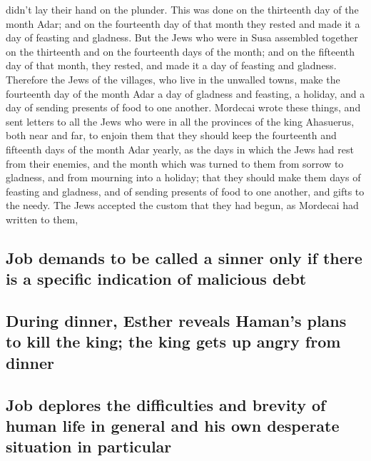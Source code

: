 didn't lay their hand on the plunder.  This was done on
the thirteenth day of the month Adar; and on the fourteenth day of that
month they rested and made it a day of feasting and gladness.
 But the Jews who were in Susa assembled together on the
thirteenth and on the fourteenth days of the month; and on the fifteenth
day of that month, they rested, and made it a day of feasting and
gladness.  Therefore the Jews of the villages, who live
in the unwalled towns, make the fourteenth day of the month Adar a day
of gladness and feasting, a holiday, and a day of sending presents of
food to one another.  Mordecai wrote these things, and
sent letters to all the Jews who were in all the provinces of the king
Ahasuerus, both near and far,  to enjoin them that they
should keep the fourteenth and fifteenth days of the month Adar yearly,
 as the days in which the Jews had rest from their
enemies, and the month which was turned to them from sorrow to gladness,
and from mourning into a holiday; that they should make them days of
feasting and gladness, and of sending presents of food to one another,
and gifts to the needy.  The Jews accepted the custom
that they had begun, as Mordecai had written to them,

\hypertarget{job-demands-to-be-called-a-sinner-only-if-there-is-a-specific-indication-of-malicious-debt}{%
\subsection{Job demands to be called a sinner only if there is a
specific indication of malicious
debt}\label{job-demands-to-be-called-a-sinner-only-if-there-is-a-specific-indication-of-malicious-debt}}

\hypertarget{during-dinner-esther-reveals-hamans-plans-to-kill-the-king-the-king-gets-up-angry-from-dinner}{%
\subsection{During dinner, Esther reveals Haman's plans to kill the
king; the king gets up angry from
dinner}\label{during-dinner-esther-reveals-hamans-plans-to-kill-the-king-the-king-gets-up-angry-from-dinner}}

\hypertarget{job-deplores-the-difficulties-and-brevity-of-human-life-in-general-and-his-own-desperate-situation-in-particular}{%
\subsection{Job deplores the difficulties and brevity of human life in
general and his own desperate situation in
particular}\label{job-deplores-the-difficulties-and-brevity-of-human-life-in-general-and-his-own-desperate-situation-in-particular}}

